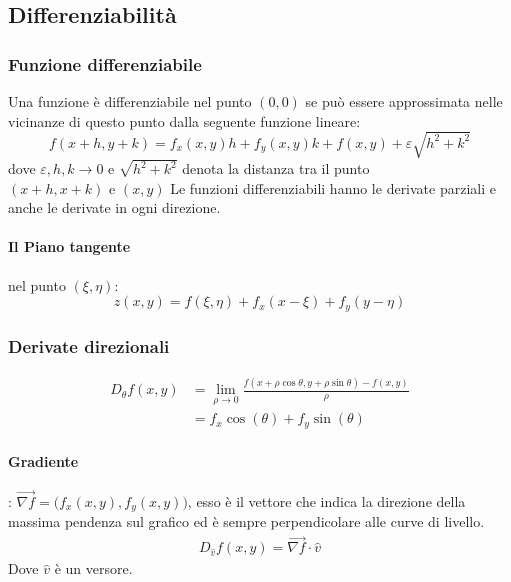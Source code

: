 \subsection{Differenziabilità}

\subsubsection{Funzione differenziabile} Una funzione è differenziabile nel punto $(0,0)$ se può essere approssimata nelle vicinanze di questo punto dalla seguente funzione lineare:
\begin{equation}
	f(x+h, y+k) = f_x(x,y)h + f_y(x,y)k + f(x,y) + \varepsilon \sqrt{h^2 + k^2}
\end{equation}
dove $\varepsilon, h, k \rightarrow 0$ e $\sqrt{h^2 + k^2}$ denota la distanza tra il punto $(x+h,x+k) \text{ e } (x,y)$
Le funzioni differenziabili hanno le derivate parziali e anche le derivate in ogni direzione.

\paragraph{Il Piano tangente} nel punto $(\xi, \eta)$:
\begin{equation}
	z(x,y) = f(\xi, \eta) + f_{x}(x - \xi) + f_{y}(y-\eta)
\end{equation}

\subsubsection{Derivate direzionali}
\begin{align*}
	D_{\theta}f(x,y) & = \lim_{\rho \rightarrow 0} \frac{f(x+\rho \cos\theta, y+\rho\sin\theta) - f(x,y)}{\rho} \\
			   & = f_x \cos(\theta) + f_y \sin(\theta)
\end{align*}
\paragraph{Gradiente}: $\vec{\nabla f} = \Big(f_x(x,y), f_y(x,y)\Big)$, esso è il vettore che indica la direzione della massima pendenza sul grafico ed è sempre perpendicolare alle curve di livello.
\begin{align*}
	D_{\hat{v}}f(x,y) = \vec{\nabla f} \cdot \hat{v}
\end{align*}
Dove $\hat{v}$ è un versore.

